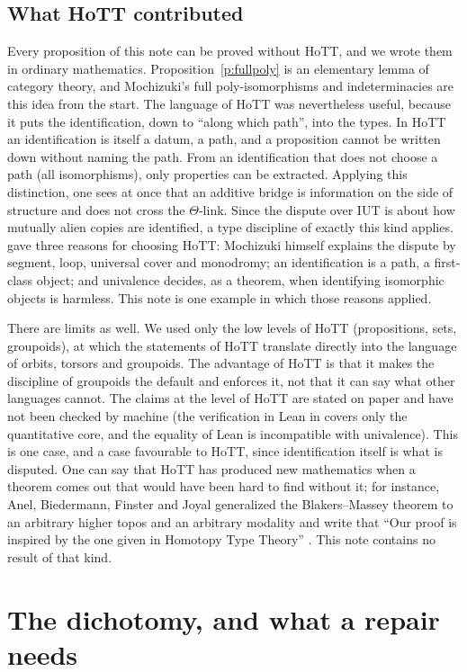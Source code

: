 \documentclass[11pt,a4paper]{article}
\numberwithin{table}{section}
\newcommand{\lab}[2]{{\upshape\fcolorbox{#1}{#1!8}{\scriptsize\sffamily\bfseries\textcolor{#1}{#2}}}}
\newcommand{\tagH}{\lab{BurntOrange}{H}}
\newcommand{\q}[1]{``#1''}
\theoremstyle{plain}
\theoremstyle{definition}
\begin{document}
\subsection{What HoTT contributed}
\tagH{} Every proposition of this note can be proved without HoTT, and we wrote them in ordinary mathematics.
Proposition~\ref{p:fullpoly} is an elementary lemma of category theory, and Mochizuki's full poly-isomorphisms and
indeterminacies are this idea from the start. The language of HoTT was nevertheless useful, because it puts the
identification, down to ``along which path'', into the types. In HoTT an identification is itself a datum, a path, and
a proposition cannot be written down without naming the path. From an identification that does not choose a path (all
isomorphisms), only properties can be extracted. Applying this distinction, one sees at once that an additive bridge is
information on the side of structure and does not cross the $\Theta$-link. Since the dispute over IUT is about how
mutually alien copies are identified, a type discipline of exactly this kind applies. \cite[\S1.1]{SL} gave three
reasons for choosing HoTT: Mochizuki himself explains the dispute by segment, loop, universal cover and monodromy; an
identification is a path, a first-class object; and univalence decides, as a theorem, when identifying isomorphic
objects is harmless. This note is one example in which those reasons applied.

\tagH{} There are limits as well. We used only the low levels of HoTT (propositions, sets, groupoids), at which the
statements of HoTT translate directly into the language of orbits, torsors and groupoids. The advantage of HoTT is that
it makes the discipline of groupoids the default and enforces it, not that it can say what other languages cannot. The
claims at the level of HoTT are stated on paper and have not been checked by machine (the verification in Lean in
\cite{SL} covers only the quantitative core, and the equality of Lean is incompatible with univalence). This is one
case, and a case favourable to HoTT, since identification itself is what is disputed. One can say that HoTT has
produced new mathematics when a theorem comes out that would have been hard to find without it; for instance, Anel,
Biedermann, Finster and Joyal generalized the Blakers--Massey theorem to an arbitrary higher topos and an arbitrary
modality and write that \q{Our proof is inspired by the one given in Homotopy Type Theory} \cite{ABFJ}. This note
contains no result of that kind.

\section{The dichotomy, and what a repair needs}
\end{document}
